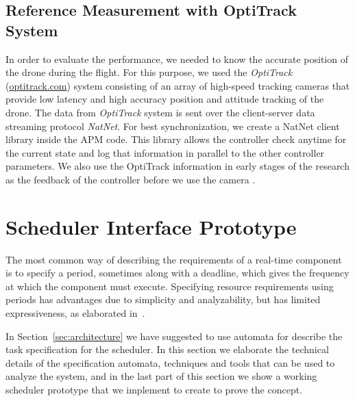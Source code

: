 \documentclass[ twoside, 12pt ]{article}
\begin{document}
\subsection{Reference Measurement with OptiTrack System}
In order to evaluate the performance, we needed to know the accurate position of the drone during the flight. For this purpose, we used the \textit{OptiTrack} (\url{optitrack.com}) system 
consisting of an array of high-speed tracking cameras that provide low latency and high accuracy position and attitude tracking of the drone. The data from \textit{OptiTrack} system is sent over the client-server data streaming protocol \textit{NatNet}.
For best synchronization, we create a NatNet client library inside the APM code. This library allows the controller check anytime for the current state and log that information in parallel to the other controller parameters.
We also use the OptiTrack information in early stages of the research as the feedback of the controller before we use the camera .

\section{Scheduler Interface Prototype}

The most common way of describing the requirements of a real-time component is to specify a period, sometimes along with a deadline, which gives the frequency at which the component must execute.
Specifying resource requirements using periods has advantages due to simplicity and analyzability, but has limited expressiveness, as elaborated in~\cite{RTComposer}. 

In Section~\ref{sec:architecture} we have suggested to use automata for describe the task specification for the scheduler. In this section we elaborate the technical details of the specification automata, techniques and tools that can be used to analyze the system,  and in the last part of this section we show a working scheduler prototype that we implement to create to prove the concept.
\end{document}
